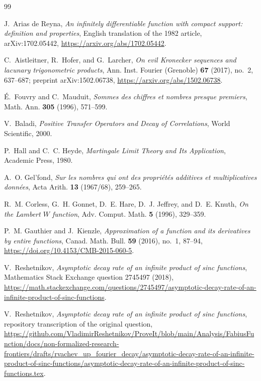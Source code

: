 \documentclass[11pt]{article}
\theoremstyle{definition}
\theoremstyle{remark}
\begin{document}
\begin{thebibliography}{99}

J.~Arias de Reyna,
\emph{An infinitely differentiable function with compact support: definition and properties},
English translation of the 1982 article, arXiv:1702.05442,
\url{https://arxiv.org/abs/1702.05442}.

C.~Aistleitner, R.~Hofer, and G.~Larcher,
\emph{On evil Kronecker sequences and lacunary trigonometric products},
Ann. Inst. Fourier (Grenoble) \textbf{67} (2017), no.~2, 637--687;
preprint arXiv:1502.06738,
\url{https://arxiv.org/abs/1502.06738}.

\'E.~Fouvry and C.~Mauduit,
\emph{Sommes des chiffres et nombres presque premiers},
Math. Ann. \textbf{305} (1996), 571--599.

V.~Baladi,
\emph{Positive Transfer Operators and Decay of Correlations},
World Scientific, 2000.

P.~Hall and C.~C. Heyde,
\emph{Martingale Limit Theory and Its Application},
Academic Press, 1980.

A.~O. Gel'fond,
\emph{Sur les nombres qui ont des propri\'et\'es additives et multiplicatives donn\'ees},
Acta Arith. \textbf{13} (1967/68), 259--265.

R.~M. Corless, G.~H. Gonnet, D.~E. Hare, D.~J. Jeffrey, and D.~E. Knuth,
\emph{On the Lambert \(W\) function},
Adv. Comput. Math. \textbf{5} (1996), 329--359.

P.~M. Gauthier and J.~Kienzle,
\emph{Approximation of a function and its derivatives by entire functions},
Canad. Math. Bull. \textbf{59} (2016), no.~1, 87--94,
\url{https://doi.org/10.4153/CMB-2015-060-5}.

V.~Reshetnikov,
\emph{Asymptotic decay rate of an infinite product of sinc functions},
Mathematics Stack Exchange question 2745497 (2018),
\url{https://math.stackexchange.com/questions/2745497/asymptotic-decay-rate-of-an-infinite-product-of-sinc-functions}.

V.~Reshetnikov,
\emph{Asymptotic decay rate of an infinite product of sinc functions},
repository transcription of the original question,
\url{https://github.com/VladimirReshetnikov/ProveIt/blob/main/Analysis/FabiusFunction/docs/non-formalized-research-frontiers/drafts/rvachev_up_fourier_decay/asymptotic-decay-rate-of-an-infinite-product-of-sinc-functions/asymptotic-decay-rate-of-an-infinite-product-of-sinc-functions.tex}.


\end{thebibliography}
\end{document}
